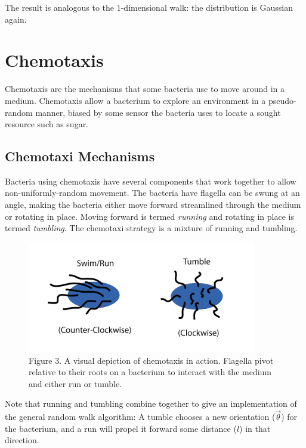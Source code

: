 \documentclass{article}
\begin{document}
  The result is analogous to the 1-dimensional walk: the distribution is Gaussian again.


\section{Chemotaxis}


  Chemotaxis are the mechanisms that some bacteria use to move around in a medium. Chemotaxis allow a bacterium to explore an environment in a pseudo-random manner, biased by some sensor the bacteria uses to locate a sought resource such as sugar.


\subsection{Chemotaxi Mechanisms}


  Bacteria using chemotaxis have several components that work together to allow non-uniformly-random movement. The bacteria have flagella can be swung at an angle, making the bacteria either move forward streamlined through the medium or rotating in place. Moving forward is termed \textit{running} and rotating in place is termed \textit{tumbling}. The chemotaxi strategy is a mixture of running and tumbling.



\begin{figure}[h]
\centering
\includegraphics[width=10cm,keepaspectratio]{images/chemotaxi-mechanisms.png}
\captionsetup{labelformat=empty} \caption{Figure 3. A visual depiction of chemotaxis in action. Flagella pivot relative to their roots on a bacterium to interact with the medium and either run or tumble.}
\end{figure}



  Note that running and tumbling combine together to give an implementation of the general random walk algorithm: A tumble chooses a new orientation ($  \vec{\theta}  $) for the bacterium, and a run will propel it forward some distance ($  l  $) in that direction.
\end{document}
